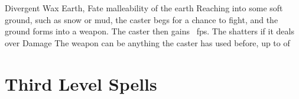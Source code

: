 \begin{multicols}{2}
  {Divergent}%
  {Wax}%
  {Earth, Fate}%
  {malleability of the earth}%
  {Reaching into some soft ground, such as snow or mud, the caster begs for a chance to fight, and the ground forms into a weapon.
  The caster then gains ~\glspl{fp}.
  The shatters if it deals over  Damage}%
  {
  The weapon can be anything the caster has used before, up to  of }

\end{multicols}

\section{Third Level Spells}

